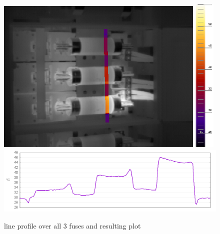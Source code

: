 \documentclass[12pt,twoside,a4paper,notitlepage]{report}
\begin{document}
\begin{figure}[ht]
 \centering
 \includegraphics[width=10cm, keepaspectratio=true]{img/FLIR_P60_hl_line}
 \includegraphics[width=9.5mm, keepaspectratio=true]{img/FLIR_P60_orig_scale}
 \includegraphics[width=14cm, keepaspectratio=true]{img/FLIR_P60_hl_line_gnuplot}
 \caption{line profile over all 3 fuses and resulting plot}
 \label{fig:tools-export-line}
\end{figure}
\end{document}
